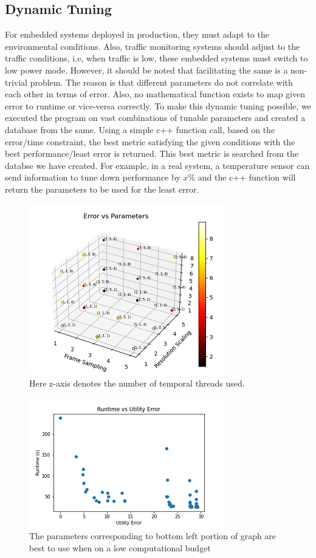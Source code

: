 \documentclass[conference]{IEEEtran}
\begin{document}
\subsection{Dynamic Tuning}

For embedded systems deployed in production, they must adapt to the environmental conditions. Also, traffic monitoring systems should adjust to the traffic conditions,
i.e, when traffic is low, these embedded systems must switch to low power mode. 
However, it should be noted that facilitating the same is a non-trivial problem. The reason is that different parameters do not correlate with each other in terms of error. Also, no mathematical function exists to map given error to runtime or vice-versa correctly.
To make this dynamic tuning possible, we executed the program on vast combinations of tunable parameters and created a database from the same.
Using a simple c++ function call, based on the error/time constraint, the best metric satisfying the given conditions with the best performance/least error is returned. This best metric is searched from the databse we have created. For example, in a real system, a temperature sensor can send information to tune down performance by $x\%$ and 
the c++ function will return the parameters to be used for the least error.

\begin{figure}[htbp]
\centerline{\includegraphics{plots/Error_vs_Params.png}}
\caption{Here z-axis denotes the number of temporal threads used.}
\label{ca_evp} 
\end{figure}
    
\begin{figure}[htbp]
\centerline{\includegraphics{plots/CompleteAnalysis_rVe.png}}
\caption{The parameters corresponding to bottom left portion of graph are best to use when on a low computational budget}
\label{ca_rve} 
\end{figure}
    
\end{document}
